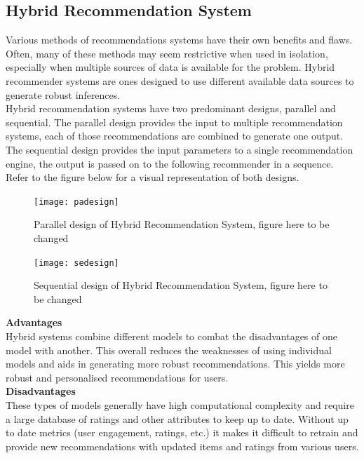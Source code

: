 \subsection{Hybrid Recommendation System}
Various methods of recommendations systems have their own benefits and flaws. Often, many of these methods may seem restrictive when used in isolation, especially when multiple sources of data is available for the problem. Hybrid recommender systems are ones designed to use different available data sources to generate robust inferences.
\\Hybrid recommendation systems have two predominant designs, parallel and sequential. The parallel design provides the input to multiple recommendation systems, each of those recommendations are combined to generate one output. The sequential design provides the input parameters to a single recommendation engine, the output is passed on to the following recommender in a sequence. Refer to the figure below for a visual representation of both designs.
\begin{figure}[ht]
\centering
\texttt{[image: padesign]}
\caption{Parallel design of Hybrid Recommendation System, figure here to be changed}
\centering
\end{figure}
\begin{figure}[ht]
\centering
\texttt{[image: sedesign]}
\caption{Sequential design of Hybrid Recommendation System, figure here to be changed}
\centering
\end{figure}

\textbf{Advantages}
\\Hybrid systems combine different models to combat the disadvantages of one model with another. This overall reduces the weaknesses of using individual models and aids in generating more robust recommendations. This yields more robust and personalised recommendations for users.
\\\textbf{Disadvantages}
\\These types of models generally have high computational complexity and require a large database of ratings and other attributes to keep up to date. Without up to date metrics (user engagement, ratings, etc.) it makes it difficult to retrain and provide new recommendations with updated items and ratings from various users.

